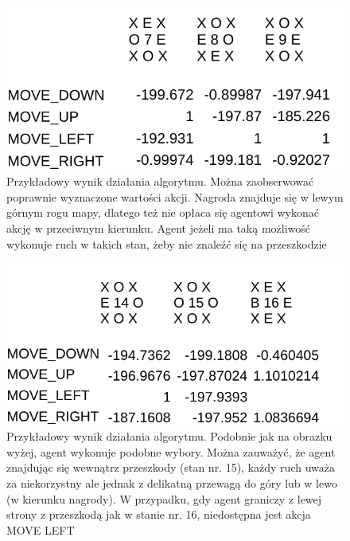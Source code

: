 \begin{figure}[H]
    \centering
    \includegraphics[scale=0.7]{wynik1}
    \caption{Przykładowy wynik działania algorytmu. Można zaobserwować poprawnie wyznaczone wartości akcji. Nagroda 
znajduje się w lewym górnym rogu mapy, dlatego też nie opłaca się agentowi wykonać akcję w przeciwnym kierunku. Agent 
jeżeli ma taką możliwość wykonuje ruch w takich stan, żeby nie znaleźć się na przeszkodzie}
    \label{fig:wynik1}
\end{figure}

\begin{figure}[H]
    \centering
    \includegraphics[scale=0.7]{wynik2}
    \caption{Przykładowy wynik działania algorytmu. Podobnie jak na obrazku wyżej, agent wykonuje podobne wybory. Można 
zauważyć, że agent znajdując się wewnątrz przeszkody (stan nr. 15), każdy ruch uważa za niekorzystny ale jednak z 
delikatną przewagą do góry lub w lewo (w kierunku nagrody). W przypadku, gdy agent graniczy z lewej strony z przeszkodą 
jak w stanie nr. 16, niedostępna jest akcja MOVE LEFT}
    \label{fig:wynik2}
\end{figure}

